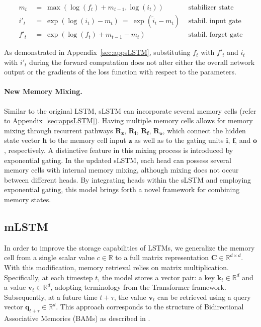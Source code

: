 \begin{align}
\label{eq:slstmstabil}
m_t \ &= \ \max \left( \log ( f_t ) + m_{t-1} , \log ( i_t ) \right) &\text{stabilizer state} \\
i'_t \ &= \ \!\exp \left( \log \left ( i_t \right) - m_t \right) \ = \ \!\exp \left( \tilde{i}_t - m_t \right) \ \, 
  &\text{stabil. input gate} \\
f'_t \ &= \ \!\exp \left( \log \left( f_t \right) + m_{t-1} - m_t \right) \ \, 
  &\text{stabil. forget gate}
\end{align}

As demonstrated in Appendix~\ref{sec:appsLSTM}, substituting $f_t$ with $f'_t$ and $i_t$ with $i'_t$ during the forward computation does not alter either the overall network output or the gradients of the loss function with respect to the parameters.

\paragraph{New Memory Mixing.} Similar to the original LSTM, sLSTM can incorporate several memory cells (refer to Appendix~\ref{sec:appsLSTM}).
Having multiple memory cells allows for memory mixing through recurrent pathways $\mathbf{R}_{\mathbf{z}}$, $\mathbf{R}_{\mathbf{i}}$, $\mathbf{R}_{\mathbf{f}}$, $\mathbf{R}_{\mathbf{o}}$, which connect the hidden state vector $\mathbf{h}$ to the memory cell input $\mathbf{z}$ as well as to the gating units $\mathbf{i}$, $\mathbf{f}$, and $\mathbf{o}$, respectively. A distinctive feature in this mixing process is introduced by exponential gating. In the updated sLSTM, each head can possess several memory cells with internal memory mixing, although mixing does not occur between different heads. By integrating heads within the sLSTM and employing exponential gating, this model brings forth a novel framework for combining memory states.

\subsection{mLSTM}
\label{sec:mLSTM}

In order to improve the storage capabilities of LSTMs, we generalize the memory cell from a single scalar value $c \in \mathbb{R}$ to a full matrix representation $\mathbf{C} \in \mathbb{R}^{d \times d}$. With this modification, memory retrieval relies on matrix multiplication. Specifically, at each timestep $t$, the model stores a vector pair: a key $\mathbf{k}_t \in \mathbb{R}^d$ and a value $\mathbf{v}_t \in \mathbb{R}^d$, adopting terminology from the Transformer framework. Subsequently, at a future time $t+\tau$, the value $\mathbf{v}_t$ can be retrieved using a query vector $\mathbf{q}_{t+\tau} \in \mathbb{R}^d$. This approach corresponds to the structure of Bidirectional Associative Memories (BAMs) as described in \citep{Kohonen:72,Anderson:72,Nakano:72,Anderson:77}.

